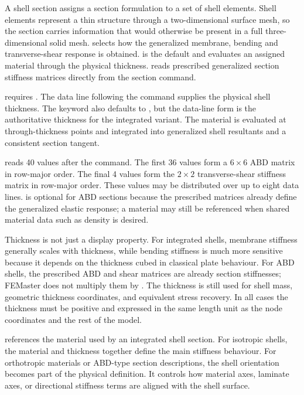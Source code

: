 A shell section assigns a section formulation to a set of shell elements. Shell elements represent a thin structure through a two-dimensional surface mesh, so the section carries information that would otherwise be present in a full three-dimensional solid mesh.  selects how the generalized membrane, bending and transverse-shear response is obtained.  is the default and evaluates an assigned material through the physical thickness.  reads prescribed generalized section stiffness matrices directly from the section command.

 requires . The data line following the command supplies the physical shell thickness. The keyword  also defaults to , but the data-line form is the authoritative thickness for the integrated variant. The material is evaluated at through-thickness points and integrated into generalized shell resultants and a consistent section tangent.

 reads 40 values after the command. The first 36 values form a \(6\times6\) ABD matrix in row-major order. The final 4 values form the \(2\times2\) transverse-shear stiffness matrix in row-major order. These values may be distributed over up to eight data lines.  is optional for ABD sections because the prescribed matrices already define the generalized elastic response; a material may still be referenced when shared material data such as density is desired.

Thickness is not just a display property. For integrated shells, membrane stiffness generally scales with thickness, while bending stiffness is much more sensitive because it depends on the thickness cubed in classical plate behaviour. For ABD shells, the prescribed ABD and shear matrices are already section stiffnesses; FEMaster does not multiply them by . The thickness is still used for shell mass, geometric thickness coordinates, and equivalent stress recovery. In all cases the thickness must be positive and expressed in the same length unit as the node coordinates and the rest of the model.

 references the material used by an integrated shell section. For isotropic shells, the material and thickness together define the main stiffness behaviour. For orthotropic materials or ABD-type section descriptions, the shell orientation becomes part of the physical definition. It controls how material axes, laminate axes, or directional stiffness terms are aligned with the shell surface.

